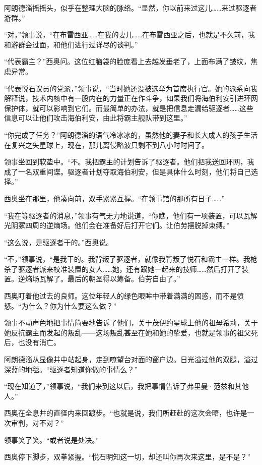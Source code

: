 \documentclass[AutoFakeBold=true]{book}
\begin{document}
阿朗德淄摇摇头，似乎在整理大脑的脉络。``显然，你以前来过这儿……来过驱逐者游群。''

``对，''领事说，``在布雷西亚……在我的妻儿……在布雷西亚之后，也就是不久前，我和游群会过面，和他们进行过详尽的谈判。''

``代表霸主？''西奥问。这位红脑袋的脸庞看上去越发垂老了，上面布满了皱纹，焦虑异常。

``代表悦石议员的党派，''领事说，``当时她还没被选举为首席执行官。她的派系向我解释说，技术内核中有一股内在的力量正在作斗争，如果我们将海伯利安引进环网保护体，就可以影响到它们。而最简单的办法，就是把信息走漏给驱逐者……这些信息可以让他们攻击海伯利安，由此将霸主舰队带到这里。''

``你完成了任务？''阿朗德淄的语气冷冰冰的，虽然他的妻子和长大成人的孩子生活在复兴之矢星球上，现在，那儿离侵略波只剩不到八小时时间了。

领事坐回到软垫中。``不。我把霸主的计划告诉了驱逐者。他们把我送回环网，我成了一名双重间谍。驱逐者计划夺取海伯利安，但是具体什么时刻，他们将自己选择。''

西奥坐在那里，他凑向前，双手紧紧互握。``在领事馆的那所有日子……''

``我在等驱逐者的消息，''领事有气无力地说道，``你瞧，他们有一项装置，可以瓦解光阴冢四周的逆熵场。他们会在准备好后打开它们。让伯劳摆脱掉束缚。''

``这么说，是驱逐者干的。''西奥说。

``不，''领事说，``是我干的。我背叛了驱逐者，就像我背叛了悦石和霸主一样。我枪杀了驱逐者派来校准装置的女人……她，还有跟她一起来的技师……然后打开了装置。逆熵场瓦解了。最后的朝圣得以筹备。伯劳自由了。''

西奥盯着他过去的良师。这位年轻人的绿色眼眸中带着满满的困惑，而不是愤怒。``为什么？你为什么要这么做？''

领事不动声色地把事情简要地告诉了他们，关于茂伊约星球上他的祖母希莉，关于她反抗霸主而发起的叛乱——这场叛乱甚至在她和她的挚爱，也就是领事的祖父死后，也没有消亡。

阿朗德淄从显像井中站起身，走到嘹望台对面的窗户边。日光溢过他的双腿，溢过深蓝的地毯。``驱逐者知道你做的事情么？''

``现在知道了，''领事说，``我们来到这以后，我把事情告诉了弗里曼·范兹和其他人。''

西奥在全息井的直径内来回踱步。``也就是说，我们所赶赴的这次会晤，也许是一次审判，对不对？''

领事笑了笑。``或者说是处决。''

西奥停下脚步，双拳紧握。``悦石明知这一切，却还叫你再次来这里，是不是？''
\end{document}
